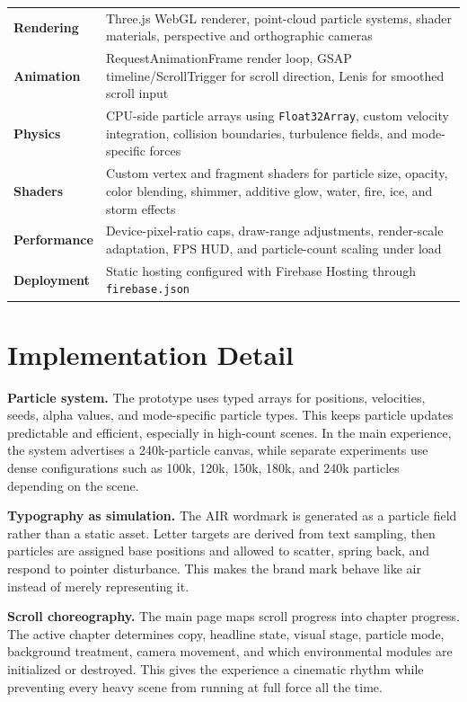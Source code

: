 \documentclass[11pt,a4paper]{article}
\newcommand{\sectionrule}{\vspace{0.2em}{\color{AirLine}\hrule height 0.8pt}\vspace{0.8em}}
\begin{document}
\begin{tabularx}{\textwidth}{>{\bfseries}p{} X}
Rendering & Three.js WebGL renderer, point-cloud particle systems, shader materials, perspective and orthographic cameras \\
Animation & RequestAnimationFrame render loop, GSAP timeline/ScrollTrigger for scroll direction, Lenis for smoothed scroll input \\
Physics & CPU-side particle arrays using \texttt{Float32Array}, custom velocity integration, collision boundaries, turbulence fields, and mode-specific forces \\
Shaders & Custom vertex and fragment shaders for particle size, opacity, color blending, shimmer, additive glow, water, fire, ice, and storm effects \\
Performance & Device-pixel-ratio caps, draw-range adjustments, render-scale adaptation, FPS HUD, and particle-count scaling under load \\
Deployment & Static hosting configured with Firebase Hosting through \texttt{firebase.json} \\
\end{tabularx}

\section*{Implementation Detail}
\sectionrule

\textbf{Particle system.} The prototype uses typed arrays for positions, velocities, seeds, alpha values, and mode-specific particle types. This keeps particle updates predictable and efficient, especially in high-count scenes. In the main experience, the system advertises a 240k-particle canvas, while separate experiments use dense configurations such as 100k, 120k, 150k, 180k, and 240k particles depending on the scene.

\textbf{Typography as simulation.} The AIR wordmark is generated as a particle field rather than a static asset. Letter targets are derived from text sampling, then particles are assigned base positions and allowed to scatter, spring back, and respond to pointer disturbance. This makes the brand mark behave like air instead of merely representing it.

\textbf{Scroll choreography.} The main page maps scroll progress into chapter progress. The active chapter determines copy, headline state, visual stage, particle mode, background treatment, camera movement, and which environmental modules are initialized or destroyed. This gives the experience a cinematic rhythm while preventing every heavy scene from running at full force all the time.
\end{document}
